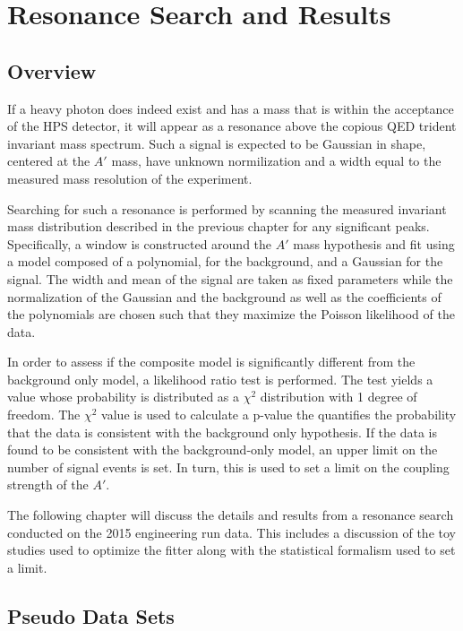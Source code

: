 
\chapter{Resonance Search and Results}

\section{Overview}

If a heavy photon does indeed exist and has a mass that is within the acceptance
of the HPS detector, it will appear as a resonance above the copious QED trident
invariant mass spectrum.  Such a signal is expected to be Gaussian in shape,
centered at the $A'$ mass, have unknown normilization and a width equal to the
measured mass resolution of the experiment.

Searching for such a resonance is performed by scanning the measured
invariant mass distribution described in the previous chapter for any 
significant peaks.  Specifically, a window
is constructed around the $A'$ mass hypothesis and fit using a model composed
of a polynomial, for the background, and a Gaussian for the signal.  The width
and mean of the signal are taken as fixed parameters while the normalization of
the Gaussian and the background as well as the coefficients of the polynomials
are chosen such that they maximize the Poisson likelihood of the data.  

In order to assess if the composite model is significantly different from the 
background only model, a likelihood ratio test is performed.  The test yields a
value whose probability is distributed as a $\chi^2$ distribution with 1 degree
of freedom.  The $\chi^2$ value is used to calculate a p-value the quantifies 
the probability 
that the data is consistent with the background only hypothesis.  If the data 
is found to be consistent with the background-only model, an upper limit on the
number of signal events is set.  In turn, this is used to set a limit on the 
coupling strength of the $A'$.

The following chapter will discuss the details and results from a resonance 
search conducted on the 2015 engineering run data.  This includes a discussion
of the toy studies used to optimize the fitter along with the statistical 
formalism used to set a limit.


\section{Pseudo Data Sets}

